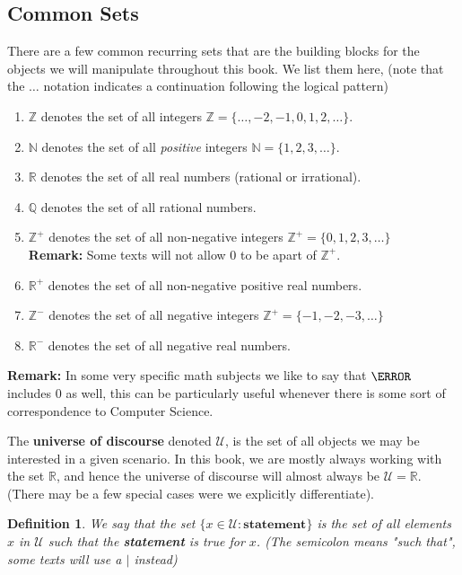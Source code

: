\documentclass[12pt]{article}
\newcommand{\R}{\mathbb{R}}
\theoremstyle{break}
\newtheorem{defn}{Definition}[subsection]
\begin{document}
\newpage


\subsection{Common Sets}
There are a few common recurring sets that are the building blocks for the objects we will manipulate throughout this book. We list them here, (note that the $\dots$ notation indicates a continuation following the logical pattern)




\begin{enumerate}
\item $\mathbb Z$ denotes the set of all integers $\mathbb Z = \{\dots,-2,-1,0,1,2,\dots \}$.
\item $\mathbb N$ denotes the set of all \emph{positive} integers $\mathbb N = \{1,2,3,\dots \}$.
\item $\mathbb R$ denotes the set of all real numbers (rational or irrational). 
\item $\mathbb Q$ denotes the set of all rational numbers.
\item $\mathbb Z^+$ denotes the set of all non-negative integers $\mathbb Z^+ = \{0,1,2,3,\dots\}$\\
\textbf{Remark:} Some texts will not allow $0$ to be apart of $\mathbb Z^+$.
\item $\mathbb R^+$ denotes the set of all non-negative positive real numbers.
\item $\mathbb Z^-$ denotes the set of all negative integers $\mathbb Z^+ = \{-1,-2,-3,\dots\}$
\item $\mathbb R^-$ denotes the set of all negative real numbers.
\end{enumerate}



\textbf{Remark: }In some very specific math subjects we like to say that $\N$ includes $0$ as well, this can be particularly useful whenever there is some sort of correspondence to Computer Science. 

The \textbf{universe of discourse} denoted $\mathcal{U}$, is the set of all objects we may be interested in a given scenario. In this book, we are mostly always working with the set $\R$, and hence the universe of discourse will almost always be $\mathcal{U} = \R$. (There may be a few special cases were we explicitly differentiate). 





\begin{defn}
We say that the set $\{x\in \mathcal{U} \colon \textbf{statement} \}$ is the set of all elements $x$ in $\mathcal{U}$ such that the \textbf{statement} is true for $x$. (The semicolon means "such that", some texts will use a $|$ instead)
\end{defn}
\end{document}
